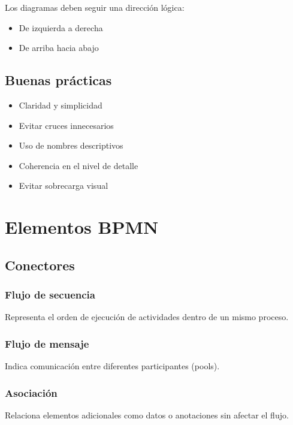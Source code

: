 \documentclass[12pt,a4paper]{article}
\begin{document}
Los diagramas deben seguir una dirección lógica:

\begin{itemize}
    \item De izquierda a derecha
    \item De arriba hacia abajo
\end{itemize}

\subsection{Buenas prácticas}

\begin{itemize}
    \item Claridad y simplicidad
    \item Evitar cruces innecesarios
    \item Uso de nombres descriptivos
    \item Coherencia en el nivel de detalle
    \item Evitar sobrecarga visual
\end{itemize}

\section{Elementos BPMN}

\subsection{Conectores}

\subsubsection{Flujo de secuencia}

Representa el orden de ejecución de actividades dentro de un mismo proceso.

\subsubsection{Flujo de mensaje}

Indica comunicación entre diferentes participantes (pools).

\subsubsection{Asociación}

Relaciona elementos adicionales como datos o anotaciones sin afectar el flujo.
\end{document}
